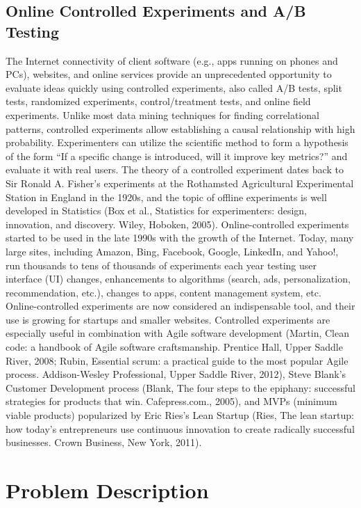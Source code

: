 \documentclass[12pt]{report}
\begin{document}
\section{Online Controlled Experiments and A/B Testing}
The Internet connectivity of client software (e.g., apps running on phones and PCs), websites, and online services provide an unprecedented opportunity to evaluate ideas quickly using controlled experiments, also called A/B tests, split tests, randomized experiments, control/treatment tests, and online field experiments. Unlike most data mining techniques for finding correlational patterns, controlled experiments allow establishing a causal relationship with high probability. Experimenters can utilize the scientific method to form a hypothesis of the form “If a specific change is introduced, will it improve key metrics?” and evaluate it with real users. The theory of a controlled experiment dates back to Sir Ronald A. Fisher’s experiments at the Rothamsted Agricultural Experimental Station in England in the 1920s, and the topic of offline experiments is well developed in Statistics (Box et al., Statistics for experimenters: design, innovation, and discovery. Wiley, Hoboken, 2005). Online-controlled experiments started to be used in the late 1990s with the growth of the Internet. Today, many large sites, including Amazon, Bing, Facebook, Google, LinkedIn, and Yahoo!, run thousands to tens of thousands of experiments each year testing user interface (UI) changes, enhancements to algorithms (search, ads, personalization, recommendation, etc.), changes to apps, content management system, etc. Online-controlled experiments are now considered an indispensable tool, and their use is growing for startups and smaller websites. Controlled experiments are especially useful in combination with Agile software development (Martin, Clean code: a handbook of Agile software craftsmanship. Prentice Hall, Upper Saddle River, 2008; Rubin, Essential scrum: a practical guide to the most popular Agile process. Addison-Wesley Professional, Upper Saddle River, 2012), Steve Blank’s Customer Development process (Blank, The four steps to the epiphany: successful strategies for products that win. Cafepress.com., 2005), and MVPs (minimum viable products) popularized by Eric Ries’s Lean Startup (Ries, The lean startup: how today’s entrepreneurs use continuous innovation to create radically successful businesses. Crown Business, New York, 2011)\cite{kohavi2017online}.
\chapter{Problem Description}
\end{document}
